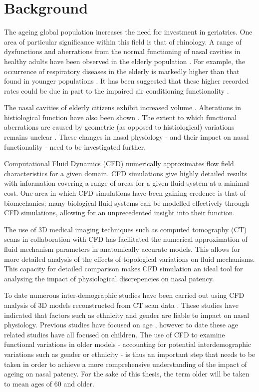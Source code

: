 \section{Background}

The ageing global population increases the need for investment in geriatrics. One area of particular significance within this field is that of rhinology. A range of dysfunctions and aberrations from the normal functioning of nasal cavities in healthy adults have been observed in the elderly population \cite{Edelstein1996, Lindemann2008}. For example, the occurrence of respiratory diseases in the elderly is markedly higher than that found in younger populations \cite{HO2001, Edelstein1996}. It has been suggested that these higher recorded rates could be due in part to the impaired air conditioning functionality \cite{Lindemann2008}.


The nasal cavities of elderly citizens exhibit increased volume \cite{Kalmovich2005}. Alterations in histiological function have also been shown \cite{HO2001}. The extent to which functional aberrations are caused by geometric (as opposed to histiological) variations remains unclear \cite{Varga-Huettner2013}. These changes in nasal physiology - and their impact on nasal functionality - need to be investigated further.


Computational Fluid Dynamics (CFD) numerically approximates flow field characteristics for a given domain. CFD simulations give highly detailed results with information covering a range of areas for a given fluid system at a minimal cost. One area in which CFD simulations have been gaining credence is that of biomechanics; many biological fluid systems can be modelled effectively through CFD simulations, allowing for an unprecedented insight into their function.

The use of 3D medical imaging techniques such as computed tomography (CT) scans in collaboration with CFD has facilitated the numerical approximation of fluid mechanism parameters in anatomically accurate models. This allows for more detailed analysis of the effects of topological variations on fluid mechanisms. This capacity for detailed comparison makes CFD simulation an ideal tool for analysing the impact of physiological discrepencies on nasal patency.


To date numerous inter-demographic studies have been carried out using CFD analysis of 3D models reconstructed from CT scan data \cite{Xi2012, Garcia2007, Zhu2011}. These studies have indicated that factors such as ethnicity and gender are liable to impact on nasal physiology. Previous studies have focused on age \cite{Xi2012}, however to date these age related studies have all focused on children. The use of CFD to examine functional variations in older models - accounting for potential interdemographic variations such as gender or ethnicity - is thus an important step that needs to be taken in order to achieve a more comprehensive understanding of the impact of ageing on nasal patency. For the sake of this thesis, the term older will be taken to mean ages of 60 and older.

